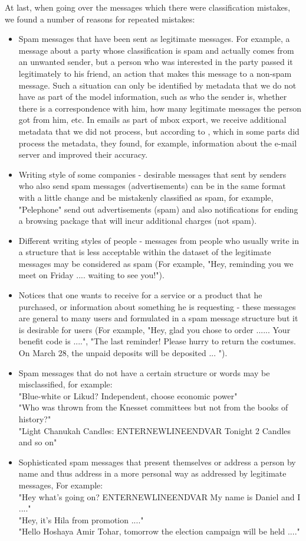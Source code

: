 \documentclass[11pt,a4paper]{article}
\begin{document}
At last, when going over the messages which there were classification mistakes, we found a number of reasons for repeated mistakes:
\begin{itemize}
\item Spam messages that have been sent as legitimate messages. For example, a message about a party whose classification is spam and actually comes from an unwanted sender, but a person who was interested in the party passed it legitimately to his friend, an action that makes this message to a non-spam message. Such a situation can only be identified by metadata that we do not have as part of the model information, such as who the sender is, whether there is a correspondence with him, how many legitimate messages the person got from him, etc. In emails as part of mbox export, we receive additional metadata that we did not process, but according to \citep{andrew2007scalable}, which in some parts did process the metadata, they found, for example, information about the e-mail server and improved their accuracy.
\item Writing style of some companies - desirable messages that sent by senders who also send spam messages (advertisements) can be in the same format with a little change and be mistakenly classified as spam, for example, "Pelephone" send out advertisements (spam) and also notifications for ending a browsing package that will incur additional charges (not spam).
\item Different writing styles of people - messages from people who usually write in a structure that is less acceptable within the dataset of the legitimate messages may be considered as spam (For example, "Hey, reminding you we meet on Friday .... waiting to see you!").
\item Notices that one wants to receive for a service or a product that he purchased, or information about something he is requesting - these messages are general to many users and formulated in a spam message structure but it is desirable for users (For example, "Hey, glad you chose to order ...... Your benefit code is ....", "The last reminder! Please hurry to return the costumes. On March 28, the unpaid deposits will be deposited ... ").
\item Spam messages that do not have a certain structure or words may be misclassified, for example:\\
"Blue-white or Likud? Independent, choose economic power"\\
"Who was thrown from the Knesset committees but not from the books of history?"\\
"Light Chanukah Candles: ENTERNEWLINEENDVAR Tonight 2 Candles and so on"
\item Sophisticated spam messages that present themselves or address a person by name and thus address in a more personal way as addressed by legitimate messages, For example:\\
"Hey what's going on? ENTERNEWLINEENDVAR My name is Daniel and I ...."\\
"Hey, it's Hila from promotion ...."\\
"Hello Hoshaya Amir Tohar, tomorrow the election campaign will be held ...."
\end{itemize}
\end{document}
